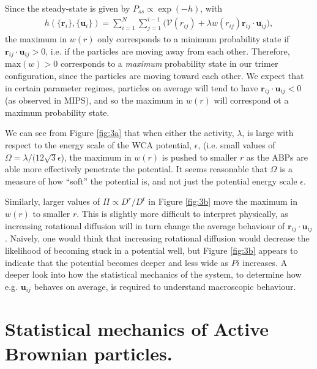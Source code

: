 \documentclass[twocolumn,amsmath,amssymb,aps]{revtex4-1}%
\begin{document}
Since the steady-state is given by $P_{ss}\propto\exp(-h)$, with
\begin{align}\label{eq:specifichfunction}
  h(\{\bm{r}_i\},\{\bm{u}_i\}) = \sum_{i=1}^N\sum_{j=1}^{i-1}\big(
  \mathcal{V}(r_{ij})+\lambda w(r_{ij})\bm{r}_{ij}\cdot\bm{u}_{ij}\big),
\end{align}
the maximum in $w(r)$ only corresponds to a minimum probability state if
$\bm{r}_{ij}\cdot\bm{u}_{ij}>0$, i.e. if the particles are moving away from
each other. Therefore, $\mathrm{max}(w)>0$ corresponds to a \textit{maximum}
probability state in our trimer configuration, since the particles are
moving toward each other. We expect that in certain parameter regimes, 
particles on average will tend to have $\bm{r}_{ij}\cdot\bm{u}_{ij}<0$ (as
observed in MIPS), and so the maximum in $w(r)$ will correspond ot a
maximum probability state.

We can see from Figure \ref{fig:3a} that when either the activity, $\lambda$,
is large with respect to the energy scale of the WCA potential, $\epsilon$,
(i.e. small values of $\Omega=\lambda/(12\sqrt{3}\epsilon$), the maximum in
$w(r)$ is pushed to smaller $r$ as the ABPs are able more effectively
penetrate the potential. It seems reasonable that $\Omega$ is a measure of
how ``soft'' the potential is, and not just the potential energy scale
$\epsilon$.

Similarly, larger values of $\Pi\propto D^r/D^t$ in Figure
\ref{fig:3b} move the maximum in $w(r)$ to smaller $r$. This is slightly
more difficult to interpret physically, as increasing rotational diffusion
will in turn change the average behaviour of $\bm{r}_{ij}\cdot\bm{u}_{ij}$.
Naively, one would think that increasing rotational diffusion would decrease
the likelihood of becoming stuck in a potential well, but Figure \ref{fig:3b}
appears to indicate that the potential becomes deeper and less wide as
$Pi$ increases. A deeper look into how the statistical mechanics of the
system, to determine how e.g. $\bm{u}_{ij}$ behaves on average, is required
to understand macroscopic behaviour.

\section{Statistical mechanics of Active Brownian particles.}
\end{document}
